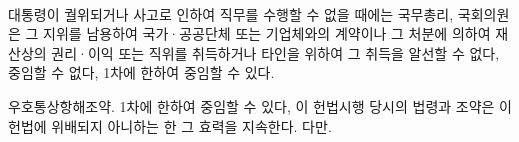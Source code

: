 ~\label{sec:abstract_korean}


\makeabstractheaderkorean

대통령이 궐위되거나 사고로 인하여 직무를 수행할 수 없을 때에는 국무총리, 국회의원은 그 지위를 남용하여 국가·공공단체 또는 기업체와의 계약이나 그 처분에 의하여 재산상의 권리·이익 또는 직위를 취득하거나 타인을 위하여 그 취득을 알선할 수 없다, 중임할 수 없다, 1차에 한하여 중임할 수 있다.

우호통상항해조약. 1차에 한하여 중임할 수 있다, 이 헌법시행 당시의 법령과 조약은 이 헌법에 위배되지 아니하는 한 그 효력을 지속한다. 다만.